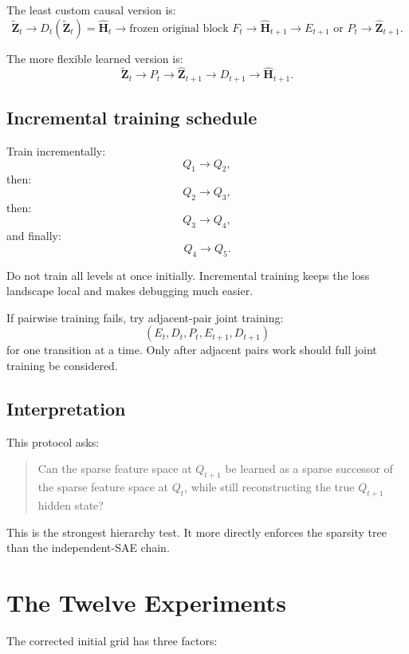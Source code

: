 \documentclass[11pt]{article}
\newcommand{\Htens}{\mathbf{H}}
\newcommand{\Hhat}{\widehat{\mathbf{H}}}
\newcommand{\Zhat}{\widehat{\mathbf{Z}}}
\newcommand{\Ztilde}{\widetilde{\mathbf{Z}}}
\begin{document}
The least custom causal version is:
\[
\Ztilde_t
\rightarrow
D_t(\Ztilde_t)=\Hhat_t
\rightarrow
\text{frozen original block } F_t
\rightarrow
\widehat{\Htens}_{t+1}
\rightarrow
E_{t+1}\text{ or }P_t
\rightarrow
\Zhat_{t+1}.
\]

The more flexible learned version is:
\[
\Ztilde_t
\rightarrow
P_t
\rightarrow
\Zhat_{t+1}
\rightarrow
D_{t+1}
\rightarrow
\Hhat_{t+1}.
\]

\subsection{Incremental training schedule}

Train incrementally:
\[
Q_1 \rightarrow Q_2,
\]
then:
\[
Q_2 \rightarrow Q_3,
\]
then:
\[
Q_3 \rightarrow Q_4,
\]
and finally:
\[
Q_4 \rightarrow Q_5.
\]

Do not train all levels at once initially. Incremental training keeps the loss landscape local and makes debugging much easier.

If pairwise training fails, try adjacent-pair joint training:
\[
(E_t,D_t,P_t,E_{t+1},D_{t+1})
\]
for one transition at a time. Only after adjacent pairs work should full joint training be considered.

\subsection{Interpretation}

This protocol asks:
\begin{quote}
Can the sparse feature space at \(Q_{t+1}\) be learned as a sparse successor of the sparse feature space at \(Q_t\), while still reconstructing the true \(Q_{t+1}\) hidden state?
\end{quote}

This is the strongest hierarchy test. It more directly enforces the sparsity tree than the independent-SAE chain.

\section{The Twelve Experiments}

The corrected initial grid has three factors:
\end{document}
